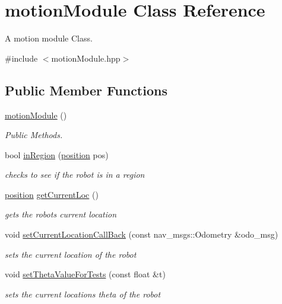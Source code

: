 \hypertarget{classmotionModule}{}\section{motion\+Module Class Reference}
\label{classmotionModule}


A motion module Class.  




{\ttfamily \#include $<$motion\+Module.\+hpp$>$}

\subsection*{Public Member Functions}
\begin{DoxyCompactItemize}
\item 
\hyperlink{classmotionModule_a61a9ef6897e181d2ba0a34494948e2b2}{motion\+Module} ()
\begin{DoxyCompactList}\small\item\em Public Methods. \end{DoxyCompactList}\item 
bool \hyperlink{classmotionModule_a57bffc2f83a9a05f69ab698875d6b0a8}{in\+Region} (\hyperlink{classposition}{position} pos)
\begin{DoxyCompactList}\small\item\em checks to see if the robot is in a region \end{DoxyCompactList}\item 
\hyperlink{classposition}{position} \hyperlink{classmotionModule_a8ee6c6f8a047df26cd82166a5342bac4}{get\+Current\+Loc} ()
\begin{DoxyCompactList}\small\item\em gets the robots current location \end{DoxyCompactList}\item 
void \hyperlink{classmotionModule_afd1bb61853930200af6989569ac6a860}{set\+Current\+Location\+Call\+Back} (const nav\+\_\+msgs\+::\+Odometry \&odo\+\_\+msg)
\begin{DoxyCompactList}\small\item\em sets the current location of the robot \end{DoxyCompactList}\item 
void \hyperlink{classmotionModule_afe21651bb696b248e121817573fabbbd}{set\+Theta\+Value\+For\+Tests} (const float \&t)
\begin{DoxyCompactList}\small\item\em sets the current location\textquotesingle{}s theta of the robot \end{DoxyCompactList}\end{DoxyCompactItemize}


